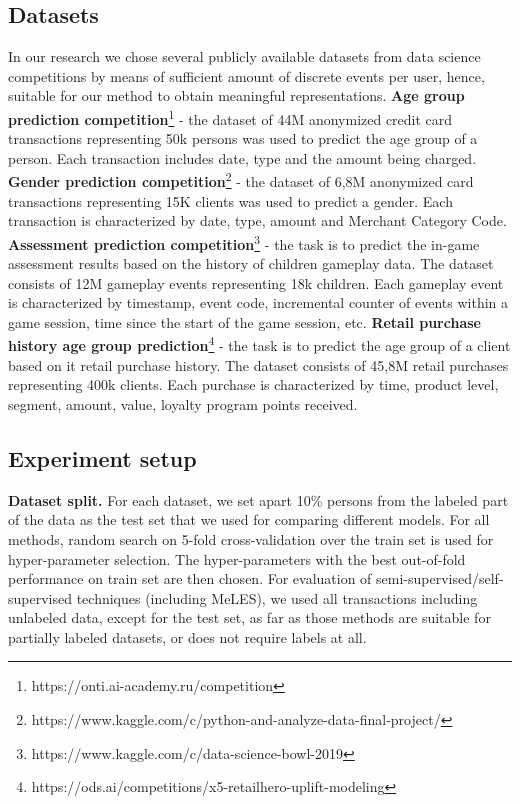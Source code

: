 \documentclass{article}
\begin{document}
\subsection{Datasets} \label{sec-datasets}

In our research we chose several publicly available datasets from data science competitions by means of sufficient amount of discrete events per user, hence, suitable for our method to obtain meaningful representations.
\newline \textbf{Age group prediction competition}\footnote{https://onti.ai-academy.ru/competition} - the dataset of 44M anonymized credit card transactions representing 50k persons was used to predict the age group of a person. Each transaction includes date, type and the amount being charged.
\newline \textbf{Gender prediction competition}\footnote{https://www.kaggle.com/c/python-and-analyze-data-final-project/} - the dataset of 6,8M anonymized card transactions representing 15K clients was used to predict a gender. Each transaction is characterized by date, type, amount and Merchant Category Code.
\newline \textbf{Assessment prediction competition}\footnote{https://www.kaggle.com/c/data-science-bowl-2019} - the task is to predict the in-game assessment results based on the history of children gameplay data. The dataset consists of 12M gameplay events representing 18k children. Each gameplay event is characterized by timestamp, event code, incremental counter of events within a game session, time since the start of the game session, etc.
\newline \textbf{Retail purchase history age group prediction}\footnote{https://ods.ai/competitions/x5-retailhero-uplift-modeling} - the task is to predict the age group of a client based on it retail purchase history. The dataset consists of 45,8M retail purchases representing 400k clients. Each purchase is characterized by time, product level, segment, amount, value, loyalty program points received.

\subsection{Experiment setup}

\textbf{Dataset split.} For each dataset, we set apart 10\% persons from the labeled part of the data as the test set that we used for comparing different models.
For all methods, random search on 5-fold cross-validation over the train set is used for hyper-parameter selection. The hyper-parameters with the best out-of-fold performance on train set are then chosen.
For evaluation of semi-supervised/self-supervised techniques (including MeLES), we used all transactions including unlabeled data, except for the test set, as far as those methods are suitable for partially labeled datasets, or does not require labels at all.
\end{document}
